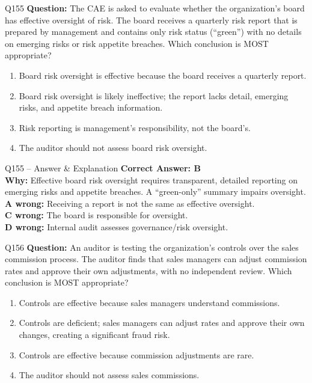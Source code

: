 \documentclass[aspectratio=169,10pt]{beamer}
\begin{document}
	\begin{frame}[t]{Q155}
		\small
		\textbf{Question:} The CAE is asked to evaluate whether the organization's board has effective oversight of risk. The board receives a quarterly risk report that is prepared by management and contains only risk status (``green'') with no details on emerging risks or risk appetite breaches. Which conclusion is MOST appropriate?
		\begin{enumerate}[label=\Alph*.,itemsep=1pt,topsep=2pt]
			\item Board risk oversight is effective because the board receives a quarterly report.
			\item Board risk oversight is likely ineffective; the report lacks detail, emerging risks, and appetite breach information.
			\item Risk reporting is management's responsibility, not the board's.
			\item The auditor should not assess board risk oversight.
		\end{enumerate}
	\end{frame}
	
	\begin{frame}[t]{Q155 -- Answer \& Explanation}
		\small
		\textbf{Correct Answer: B} \\[4pt]
		\textbf{Why:} Effective board risk oversight requires transparent, detailed reporting on emerging risks and appetite breaches. A ``green-only'' summary impairs oversight. \\[4pt]
		\textbf{A wrong:} Receiving a report is not the same as effective oversight. \\[2pt]
		\textbf{C wrong:} The board is responsible for oversight. \\[2pt]
		\textbf{D wrong:} Internal audit assesses governance/risk oversight.
	\end{frame}
	
	\begin{frame}[t]{Q156}
		\small
		\textbf{Question:} An auditor is testing the organization's controls over the sales commission process. The auditor finds that sales managers can adjust commission rates and approve their own adjustments, with no independent review. Which conclusion is MOST appropriate?
		\begin{enumerate}[label=\Alph*.,itemsep=1pt,topsep=2pt]
			\item Controls are effective because sales managers understand commissions.
			\item Controls are deficient; sales managers can adjust rates and approve their own changes, creating a significant fraud risk.
			\item Controls are effective because commission adjustments are rare.
			\item The auditor should not assess sales commissions.
		\end{enumerate}
	\end{frame}
	
\end{document}
